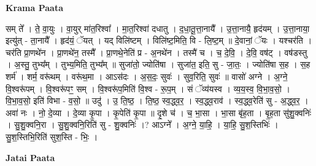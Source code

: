 \documentclass[17pt]{extarticle}
\begin{document}
\textbf{Krama Paata} \newline

सम् ते᳚ । ते॒ वा॒युः । वा॒युर् मा॑त॒रिश्वा᳚ । मा॒त॒रिश्वा॑ दधातु । द॒धा॒तू॒त्ता॒नायै᳚ । उ॒त्ता॒नायै॒ हृद॑यम् । उ॒त्ता॒नाया॒ इत्यु॑त् - ता॒नायै᳚ । हृद॑यं॒ ॅयत् । यद् विलि॑ष्टम् । विलि॑ष्ट॒मिति॒ वि - लि॒ष्ट॒म् ॥ दे॒वानां॒ ॅयः । यश्चर॑ति । चर॑ति प्रा॒णथे॑न । प्रा॒णथे॑न॒ तस्मै᳚ । प्रा॒णथे॒नेति॑ प्र - अ॒नथे॑न । तस्मै॑ च । च॒ दे॒वि॒ । दे॒वि॒ वष॑ट् । वष॑डस्तु । अ॒स्तु॒ तुभ्य᳚म् । तुभ्य॒मिति॒ तुभ्य᳚म् ॥ सुजा॑तो॒ ज्योति॑षा । सुजा॑त॒ इति॒ सु - जा॒तः॒ । ज्योति॑षा स॒ह । स॒ह शर्म॑ । शर्म॒ वरू॑थम् । वरू॑थ॒मा । आऽस॑दः । अ॒स॒दः॒ सुवः॑ । सुव॒रिति॒ सुवः॑ ॥ वासो॑ अग्ने । अ॒ग्ने॒ वि॒श्वरू॑पम् । वि॒श्वरू॑पꣳ॒॒ सम् । वि॒श्वरू॑प॒मिति॑ वि॒श्व - रू॒प॒म् । सं ॅव्य॑यस्व । व्य॒य॒स्व॒ वि॒भा॒व॒सो॒ । वि॒भा॒व॒सो॒ इति॑ विभा - व॒सो॒ ॥ उदु॑ । उ॒ ति॒ष्ठ॒ । ति॒ष्ठ॒ स्व॒द्ध्व॒र॒ । स्व॒द्ध्व॒राव॑ । स्व॒द्ध्व॒रेति॑ सु - अ॒द्ध्व॒र॒ । अवा॑ नः । नो॒ दे॒व्या । दे॒व्या कृ॒पा । कृ॒पेति॑ कृ॒पा ॥ दृ॒शे च॑ । च॒ भा॒सा । भा॒सा बृ॑ह॒ता । बृ॒ह॒ता सु॑शु॒क्वनिः॑ । सु॒शु॒क्वनि॒रा । सु॒शु॒क्वनि॒रिति॑ सु - शु॒क्वनिः॑ ।? आऽग्ने᳚ । अ॒ग्ने॒ या॒हि॒ । या॒हि॒ सु॒श॒स्तिभिः॑ । सु॒श॒स्तिभि॒रिति॑ सुश॒स्ति - भिः॒ । \newline

\textbf{Jatai Paata} \newline
\end{document}
